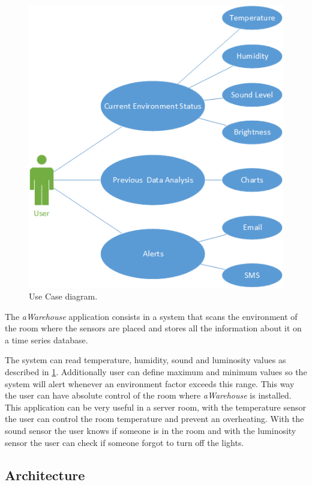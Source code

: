 \documentclass[12pt]{report}
\begin{document}
\begin{figure}
    \centering
    \includegraphics[scale=0.5]{img/use.png}
    \caption{Use Case diagram.}
    \label{fig:use}
\end{figure}

The \textit{aWarehouse} application consists in a system that scans the environment of the room where the sensors are placed and stores all the information about it on a time series database.

The system can read temperature, humidity, sound and luminosity values as described in \ref{fig:use}. Additionally user can define maximum and minimum values so the system will alert whenever an environment factor exceeds this range.
This way the user can have absolute control of the room where \textit{aWarehouse} is installed. This application can be very useful in a server room, with the temperature sensor the user can control the room temperature and prevent an overheating. With the sound sensor the user knows if someone is in the room and with the luminosity sensor the user can check if someone forgot to turn off the lights.



\subsection{Architecture}
\end{document}
